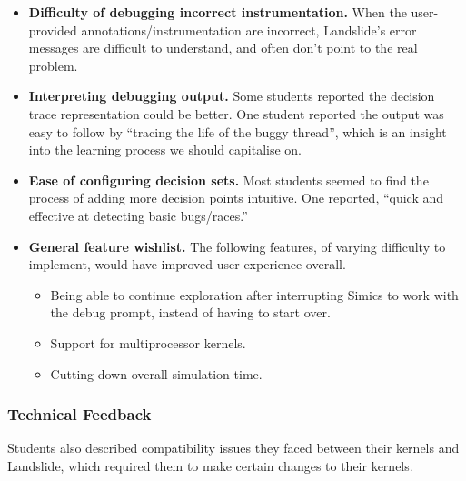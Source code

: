 \begin{itemize}
	\item {\bf Difficulty of debugging incorrect instrumentation.} When the user-provided annotations/instrumentation are incorrect, Landslide's error messages are difficult to understand, and often don't point to the real problem.
	\item {\bf Interpreting debugging output.} Some students reported the decision trace representation could be better. One student reported the output was easy to follow by ``tracing the life of the buggy thread'', which is an insight into the learning process we should capitalise on.
	\item {\bf Ease of configuring decision sets.} Most students seemed to find the process of adding more decision points intuitive. One reported, ``quick and effective at detecting basic bugs/races.'' 
	\item {\bf General feature wishlist.} The following features, of varying difficulty to implement, would have improved user experience overall.
		\begin{itemize}
			\item Being able to continue exploration after interrupting Simics to work with the debug prompt, instead of having to start over.
			\item Support for multiprocessor kernels.
			\item Cutting down overall simulation time.
		\end{itemize}
\end{itemize}

\subsubsection{Technical Feedback}

Students also described compatibility issues they faced between their kernels and Landslide, which required them to make certain changes to their kernels.

